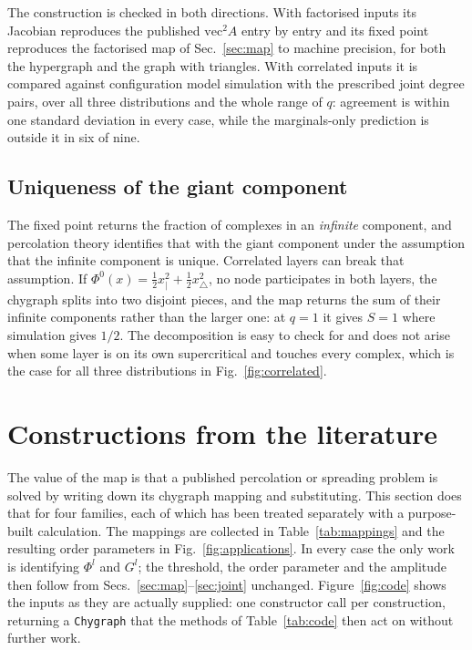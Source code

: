 \documentclass[aps,pre,twocolumn,superscriptaddress,floatfix,longbibliography]{revtex4-2}
\newcommand{\vecA}{\mathrm{vec}^2 A}
\newcommand{\code}[1]{\texttt{#1}}
\begin{document}
The construction is checked in both directions. With factorised inputs its
Jacobian reproduces the published $\vecA$ entry by entry and its fixed point
reproduces the factorised map of Sec.~\ref{sec:map} to machine precision, for both the
hypergraph and the graph with triangles. With correlated inputs it is compared
against configuration model simulation with the prescribed joint degree pairs,
over all three distributions and the whole range of $q$: agreement is within one
standard deviation in every case, while the marginals-only prediction is outside
it in six of nine.


\subsection{Uniqueness of the giant component}

The fixed point returns the fraction of complexes in an \emph{infinite}
component, and percolation theory identifies that with the giant component under
the assumption that the infinite component is unique. Correlated layers can
break that assumption. If $\Phi^0(x)=\tfrac12x_|^2+\tfrac12x_\triangle^2$, no
node participates in both layers, the chygraph splits into two disjoint pieces,
and the map returns the sum of their infinite components rather than the larger
one: at $q=1$ it gives $S=1$ where simulation gives $1/2$. The decomposition is
easy to check for and does not arise when some layer is on its own supercritical
and touches every complex, which is the case for all three distributions in
Fig.~\ref{fig:correlated}.

\section{Constructions from the literature}\label{sec:constructions}

The value of the map is that a published percolation or spreading problem is
solved by writing down its chygraph mapping and substituting. This section does
that for four families, each of which has been treated separately with a
purpose-built calculation. The mappings are collected in
Table~\ref{tab:mappings} and the resulting order parameters in
Fig.~\ref{fig:applications}. In every case the only work is identifying
$\Phi^l$ and $G^l$; the threshold, the order parameter and the amplitude then
follow from Secs.~\ref{sec:map}--\ref{sec:joint} unchanged. Figure~\ref{fig:code}
shows the inputs as they are actually supplied: one constructor call per
construction, returning a \code{Chygraph} that the methods of
Table~\ref{tab:code} then act on without further work.
\end{document}
